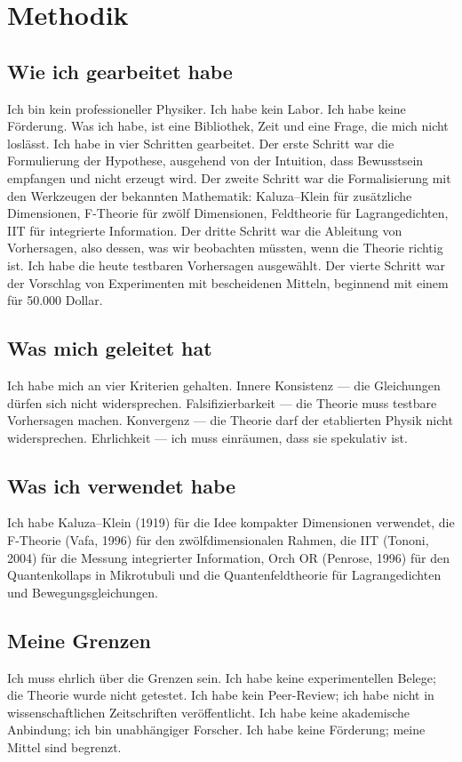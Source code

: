 \documentclass[11pt,a4paper]{article}
\begin{document}
\section{Methodik}
\subsection{Wie ich gearbeitet habe}
Ich bin kein professioneller Physiker. Ich habe kein Labor. Ich habe keine Förderung. Was ich habe, ist eine Bibliothek, Zeit und eine Frage, die mich nicht loslässt. Ich habe in vier Schritten gearbeitet. Der erste Schritt war die Formulierung der Hypothese, ausgehend von der Intuition, dass Bewusstsein empfangen und nicht erzeugt wird. Der zweite Schritt war die Formalisierung mit den Werkzeugen der bekannten Mathematik: Kaluza--Klein für zusätzliche Dimensionen, F-Theorie für zwölf Dimensionen, Feldtheorie für Lagrangedichten, IIT für integrierte Information. Der dritte Schritt war die Ableitung von Vorhersagen, also dessen, was wir beobachten müssten, wenn die Theorie richtig ist. Ich habe die heute testbaren Vorhersagen ausgewählt. Der vierte Schritt war der Vorschlag von Experimenten mit bescheidenen Mitteln, beginnend mit einem für 50.000 Dollar.

\subsection{Was mich geleitet hat}
Ich habe mich an vier Kriterien gehalten. Innere Konsistenz --- die Gleichungen dürfen sich nicht widersprechen. Falsifizierbarkeit --- die Theorie muss testbare Vorhersagen machen. Konvergenz --- die Theorie darf der etablierten Physik nicht widersprechen. Ehrlichkeit --- ich muss einräumen, dass sie spekulativ ist.

\subsection{Was ich verwendet habe}
Ich habe Kaluza--Klein (1919) für die Idee kompakter Dimensionen verwendet, die F-Theorie (Vafa, 1996) für den zwölfdimensionalen Rahmen, die IIT (Tononi, 2004) für die Messung integrierter Information, Orch OR (Penrose, 1996) für den Quantenkollaps in Mikrotubuli und die Quantenfeldtheorie für Lagrangedichten und Bewegungsgleichungen.

\subsection{Meine Grenzen}
Ich muss ehrlich über die Grenzen sein. Ich habe keine experimentellen Belege; die Theorie wurde nicht getestet. Ich habe kein Peer-Review; ich habe nicht in wissenschaftlichen Zeitschriften veröffentlicht. Ich habe keine akademische Anbindung; ich bin unabhängiger Forscher. Ich habe keine Förderung; meine Mittel sind begrenzt.
\end{document}
